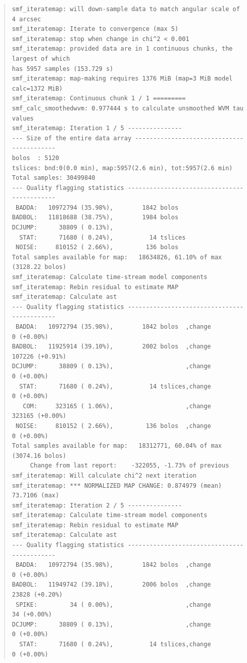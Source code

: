 \documentclass[twoside,11pt]{article}
\renewcommand{\_}{\texttt{\symbol{95}}}
\newenvironment{myquote}{\begin{quote}\begin{small}}{\end{small}\end{quote}}
\begin{document}
\begin{myquote}
\begin{verbatim}
smf_iteratemap: will down-sample data to match angular scale of 4 arcsec
smf_iteratemap: Iterate to convergence (max 5)
smf_iteratemap: stop when change in chi^2 < 0.001
smf_iteratemap: provided data are in 1 continuous chunks, the largest of which
has 5957 samples (153.729 s)
smf_iteratemap: map-making requires 1376 MiB (map=3 MiB model calc=1372 MiB)
smf_iteratemap: Continuous chunk 1 / 1 =========
smf_calc_smoothedwvm: 0.977444 s to calculate unsmoothed WVM tau values
smf_iteratemap: Iteration 1 / 5 ---------------
--- Size of the entire data array ------------------------------------------
bolos  : 5120
tslices: bnd:0(0.0 min), map:5957(2.6 min), tot:5957(2.6 min)
Total samples: 30499840
--- Quality flagging statistics --------------------------------------------
 BADDA:   10972794 (35.98%),        1842 bolos
BADBOL:   11818688 (38.75%),        1984 bolos
DCJUMP:      38809 ( 0.13%),
  STAT:      71680 ( 0.24%),          14 tslices
 NOISE:     810152 ( 2.66%),         136 bolos
Total samples available for map:   18634826, 61.10% of max (3128.22 bolos)
smf_iteratemap: Calculate time-stream model components
smf_iteratemap: Rebin residual to estimate MAP
smf_iteratemap: Calculate ast
--- Quality flagging statistics --------------------------------------------
 BADDA:   10972794 (35.98%),        1842 bolos  ,change          0 (+0.00%)
BADBOL:   11925914 (39.10%),        2002 bolos  ,change     107226 (+0.91%)
DCJUMP:      38809 ( 0.13%),                    ,change          0 (+0.00%)
  STAT:      71680 ( 0.24%),          14 tslices,change          0 (+0.00%)
   COM:     323165 ( 1.06%),                    ,change     323165 (+0.00%)
 NOISE:     810152 ( 2.66%),         136 bolos  ,change          0 (+0.00%)
Total samples available for map:   18312771, 60.04% of max (3074.16 bolos)
     Change from last report:    -322055, -1.73% of previous
smf_iteratemap: Will calculate chi^2 next iteration
smf_iteratemap: *** NORMALIZED MAP CHANGE: 0.874979 (mean) 73.7106 (max)
smf_iteratemap: Iteration 2 / 5 ---------------
smf_iteratemap: Calculate time-stream model components
smf_iteratemap: Rebin residual to estimate MAP
smf_iteratemap: Calculate ast
--- Quality flagging statistics --------------------------------------------
 BADDA:   10972794 (35.98%),        1842 bolos  ,change          0 (+0.00%)
BADBOL:   11949742 (39.18%),        2006 bolos  ,change      23828 (+0.20%)
 SPIKE:         34 ( 0.00%),                    ,change         34 (+0.00%)
DCJUMP:      38809 ( 0.13%),                    ,change          0 (+0.00%)
  STAT:      71680 ( 0.24%),          14 tslices,change          0 (+0.00%)

\end{verbatim}
\end{myquote}
\end{document}

